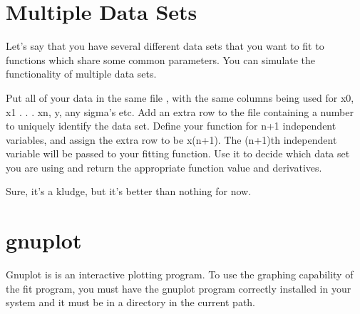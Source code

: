 \section{Multiple Data Sets}

        Let's say that you have several different data sets
 that you want to fit to functions which share some common
 parameters. You can simulate the functionality of multiple
 data sets.

 Put all of your data in the same file , with the same
 columns being used for x0, x1 . . . xn, y, any sigma's etc.
 Add an extra row to the file containing a number to
 uniquely identify the data set.  Define your function for 
 n+1 independent variables, and assign the extra row to be
 x(n+1).  The (n+1)th independent variable will be passed to
 your fitting function.  Use it to decide which data set you
 are using and return the appropriate function value and
 derivatives.

 Sure, it's a kludge, but it's better than nothing for now.

\section{gnuplot}

        Gnuplot is is an interactive plotting program. To
 use the graphing capability of the fit program, you must
 have the gnuplot program correctly installed in your system
 and it must be in a directory in the current path.


